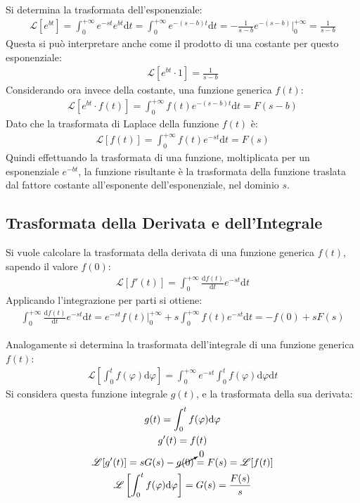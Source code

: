 \documentclass{article}
\newcommand{\df}{\mathrm{d}}
\newcommand{\intab}[4]{\displaystyle\int_{#1}^{#2}{#3}\df{#4}}
\newcommand{\intpinf}[2]{\intab{0}{+\infty}{#1}{#2}}
\numberwithin{equation}{subsection}
\begin{document}
Si determina la trasformata dell'esponenziale:
\begin{gather*}
    \mathscr{L}\left[e^{bt}\right]=\intpinf{e^{-st}e^{bt}}{t}=\intpinf{e^{-(s-b)t}}{t}=-\frac{1}{s-b}e^{-(s-b)}\bigg|_0^{+\infty}=\frac{1}{s-b}
\end{gather*}
Questa si può interpretare anche come il prodotto di una costante per questo esponenziale:
\begin{gather*}
    \mathscr{L}\left[e^{bt}\cdot 1\right]=\frac{1}{s-b}
\end{gather*}
Considerando ora invece della costante, una funzione generica $f(t)$:
\begin{gather*}
    \mathscr{L}\left[e^{bt}\cdot f(t)\right]=\intpinf{f(t)e^{-(s-b)t}}{t}=F(s-b)
\end{gather*}
Dato che la trasformata di Laplace della funzione $f(t)$ è:
\begin{gather*}
    \mathscr{L}[f(t)]=\intpinf{f(t)e^{-st}}{t}=F(s)
\end{gather*}
Quindi effettuando la trasformata di una funzione, moltiplicata per un esponenziale $e^{-bt}$, la funzione risultante è la trasformata della funzione traslata dal fattore costante all'esponente dell'esponenziale, nel dominio $s$. 

\subsection{Trasformata della Derivata e dell'Integrale}

Si vuole calcolare la trasformata della derivata di una funzione generica $f(t)$, sapendo il valore $f(0)$:
\begin{gather*}
    \mathscr{L}[f'(t)]=\intpinf{\frac{\df f(t)}{\df t}e^{-st}}{t}
\end{gather*}
Applicando l'integrazione per parti si ottiene:
\begin{gather*}
    \intpinf{\frac{\df f(t)}{\df t}e^{-st}}{t}=e^{-st}f(t)\bigg|_0^{+\infty}+s\intpinf{f(t)e^{-st}}{t}=-f(0)+sF(s)
\end{gather*}


Analogamente si determina la trasformata dell'integrale di una funzione generica $f(t)$:
\begin{gather*}
    \mathscr{L}\left[\int_0^t f(\varphi)\df \varphi\right]=\intpinf{e^{-st}\int_0^t f(\varphi)\df\varphi}{t}
\end{gather*}
Si considera questa funzione integrale $g(t)$, e la trasformata della sua derivata:
\begin{gather*}
    g(t)=\int_0^t f(\varphi)\df\varphi\\
    g'(t)=f(t)\\
    \mathscr{L}[g'(t)]=sG(s)-\cancelto{0}{g(0)}=F(s)=\mathscr{L}[f(t)]\\
    \mathscr{L}\left[\int_0^tf(\varphi)\df\varphi\right]=G(s)=\frac{F(s)}{s}
\end{gather*}
\end{document}
